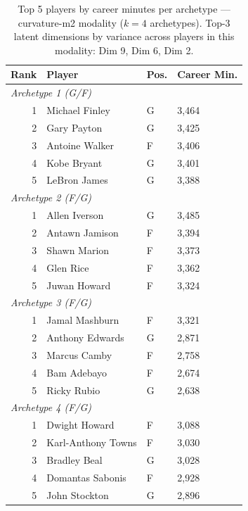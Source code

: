 \begin{table}[htbp]
  \centering\small
  \begin{tabular}{rlll}
    \toprule
    Rank & Player & Pos. & Career Min. \\
    \midrule
    \multicolumn{4}{l}{\textit{Archetype 1 (G/F)}} \\
    \midrule
    1 & Michael Finley & G & 3,464 \\
    2 & Gary Payton & G & 3,425 \\
    3 & Antoine Walker & F & 3,406 \\
    4 & Kobe Bryant & G & 3,401 \\
    5 & LeBron James & G & 3,388 \\
    \midrule[0.4pt]
    \multicolumn{4}{l}{\textit{Archetype 2 (F/G)}} \\
    \midrule
    1 & Allen Iverson & G & 3,485 \\
    2 & Antawn Jamison & F & 3,394 \\
    3 & Shawn Marion & F & 3,373 \\
    4 & Glen Rice & F & 3,362 \\
    5 & Juwan Howard & F & 3,324 \\
    \midrule[0.4pt]
    \multicolumn{4}{l}{\textit{Archetype 3 (F/G)}} \\
    \midrule
    1 & Jamal Mashburn & F & 3,321 \\
    2 & Anthony Edwards & G & 2,871 \\
    3 & Marcus Camby & F & 2,758 \\
    4 & Bam Adebayo & F & 2,674 \\
    5 & Ricky Rubio & G & 2,638 \\
    \midrule[0.4pt]
    \multicolumn{4}{l}{\textit{Archetype 4 (F/G)}} \\
    \midrule
    1 & Dwight Howard & F & 3,088 \\
    2 & Karl-Anthony Towns & F & 3,030 \\
    3 & Bradley Beal & G & 3,028 \\
    4 & Domantas Sabonis & F & 2,928 \\
    5 & John Stockton & G & 2,896 \\
    \bottomrule
  \end{tabular}
  \caption{Top 5 players by career minutes per archetype --- curvature-m2 modality ($k=4$ archetypes). Top-3 latent dimensions by variance across players in this modality: Dim 9, Dim 6, Dim 2.}
  \label{tab:arch_reps_curvature_m2}
\end{table}

